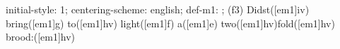 initial-style: 1;
centering-scheme: english;
def-m1: \grealign;
(f3) Didst([em1]iv) bring([em1]g) to([em1]hv) light([em1]f) a([em1]e) two([em1]hv)fold([em1]hv) brood:([em1]hv)
